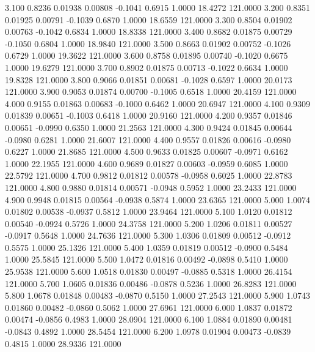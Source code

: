    3.100   0.8236   0.01938   0.00808  -0.1041   0.6915   1.0000  18.4272 121.0000
   3.200   0.8351   0.01925   0.00791  -0.1039   0.6870   1.0000  18.6559 121.0000
   3.300   0.8504   0.01902   0.00763  -0.1042   0.6834   1.0000  18.8338 121.0000
   3.400   0.8682   0.01875   0.00729  -0.1050   0.6804   1.0000  18.9840 121.0000
   3.500   0.8663   0.01902   0.00752  -0.1026   0.6729   1.0000  19.3622 121.0000
   3.600   0.8758   0.01895   0.00740  -0.1020   0.6675   1.0000  19.6279 121.0000
   3.700   0.8902   0.01875   0.00713  -0.1022   0.6634   1.0000  19.8328 121.0000
   3.800   0.9066   0.01851   0.00681  -0.1028   0.6597   1.0000  20.0173 121.0000
   3.900   0.9053   0.01874   0.00700  -0.1005   0.6518   1.0000  20.4159 121.0000
   4.000   0.9155   0.01863   0.00683  -0.1000   0.6462   1.0000  20.6947 121.0000
   4.100   0.9309   0.01839   0.00651  -0.1003   0.6418   1.0000  20.9160 121.0000
   4.200   0.9357   0.01846   0.00651  -0.0990   0.6350   1.0000  21.2563 121.0000
   4.300   0.9424   0.01845   0.00644  -0.0980   0.6281   1.0000  21.6007 121.0000
   4.400   0.9557   0.01826   0.00616  -0.0980   0.6227   1.0000  21.8685 121.0000
   4.500   0.9633   0.01825   0.00607  -0.0971   0.6162   1.0000  22.1955 121.0000
   4.600   0.9689   0.01827   0.00603  -0.0959   0.6085   1.0000  22.5792 121.0000
   4.700   0.9812   0.01812   0.00578  -0.0958   0.6025   1.0000  22.8783 121.0000
   4.800   0.9880   0.01814   0.00571  -0.0948   0.5952   1.0000  23.2433 121.0000
   4.900   0.9948   0.01815   0.00564  -0.0938   0.5874   1.0000  23.6365 121.0000
   5.000   1.0074   0.01802   0.00538  -0.0937   0.5812   1.0000  23.9464 121.0000
   5.100   1.0120   0.01812   0.00540  -0.0924   0.5726   1.0000  24.3758 121.0000
   5.200   1.0206   0.01811   0.00527  -0.0917   0.5648   1.0000  24.7636 121.0000
   5.300   1.0306   0.01809   0.00512  -0.0912   0.5575   1.0000  25.1326 121.0000
   5.400   1.0359   0.01819   0.00512  -0.0900   0.5484   1.0000  25.5845 121.0000
   5.500   1.0472   0.01816   0.00492  -0.0898   0.5410   1.0000  25.9538 121.0000
   5.600   1.0518   0.01830   0.00497  -0.0885   0.5318   1.0000  26.4154 121.0000
   5.700   1.0605   0.01836   0.00486  -0.0878   0.5236   1.0000  26.8283 121.0000
   5.800   1.0678   0.01848   0.00483  -0.0870   0.5150   1.0000  27.2543 121.0000
   5.900   1.0743   0.01860   0.00482  -0.0860   0.5062   1.0000  27.6961 121.0000
   6.000   1.0837   0.01872   0.00474  -0.0856   0.4983   1.0000  28.0904 121.0000
   6.100   1.0884   0.01890   0.00481  -0.0843   0.4892   1.0000  28.5454 121.0000
   6.200   1.0978   0.01904   0.00473  -0.0839   0.4815   1.0000  28.9336 121.0000
